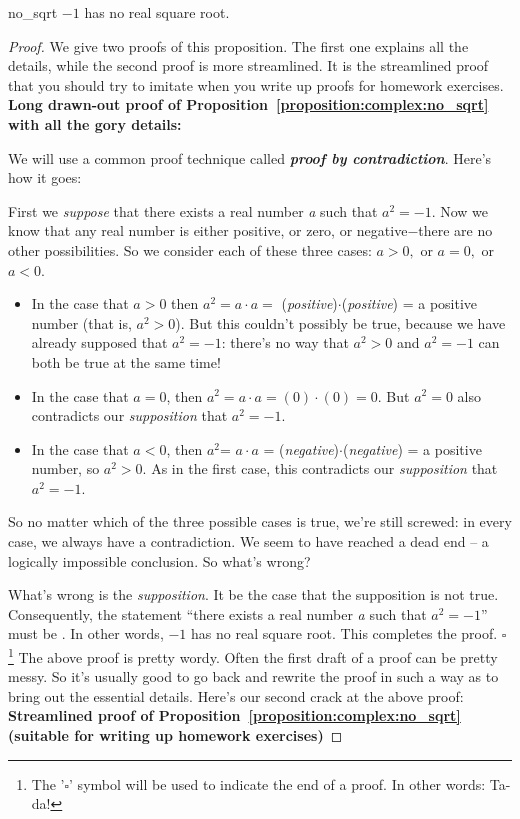 \begin{prop}{no_sqrt} $-1$ has no real square root.
\end{prop}
\begin{proof}
We give two proofs of this proposition. The first one explains all
the details, while the second proof is more streamlined. It is the streamlined
proof that you should try to imitate when you write up proofs for
homework exercises.
\medskip{}
\newline
\noindent \textbf{Long drawn-out proof of Proposition~\ref{proposition:complex:no_sqrt} with all the gory details:} 

We will use a common proof technique called {\bf \emph{ proof by contradiction}}. 
Here's how it goes:

First we \emph{suppose} that there exists a real number \emph{a} such that
$a^{2}=-1$. Now we know that any real number is either positive, or zero, or negative$-$there are no other possibilities. So we consider each of these three cases: $a>0,$ or $a=0,$ or $a<0$.

\begin{itemize}
\item
In the case that $a>0$ then $a^{2}= a\cdot a =$ (\emph{positive})$\cdot$(\emph{positive})
= a positive number (that is, $a^{2}>0$). But this couldn't possibly
be true, because we have already supposed that $a^{2}=-1$: there's
no way that $a^{2}>0$ and $a^{2}=-1$ can both be true at the same
time!

\item
In the case that $a=0$, then $a^{2}=a\cdot a = (0)\cdot(0)
= 0$. But $a^{2}=0$ also contradicts our \emph{supposition} that $a^{2}=-1$.
\item
In the case that $a<0$, then $a^{2}$= $a\cdot a$ = (\emph{negative})$\cdot$(\emph{negative})
= a positive number, so $a^{2}>0$. As in the first case, this contradicts
our \emph{supposition} that $a^{2}=-1$.
\end{itemize}

So no matter which of the three possible cases is true, we're still
screwed: in every case, we always have a contradiction. We seem to have reached a dead end -- a logically impossible conclusion. So what's wrong?

What's wrong is the \emph{supposition}. It  be the case that the supposition is not
true. Consequently, the statement ``there exists a real number
\emph{a} such that $a^{2}=-1$'' must be . In other
words, $-1$ has no real square root. This completes the proof. $\square$
\footnote{The '$\square$' symbol will be used to indicate the end of a proof. In other words: Ta-da!}
\medskip{}
\newline
The above proof is pretty wordy. Often the first draft of a proof can be pretty messy. So it's usually good to go back and rewrite the proof in such a  way as to bring out the essential details. Here's our second crack at the above proof:
\medskip{}
\newline
\noindent \textbf{Streamlined proof of Proposition~\ref{proposition:complex:no_sqrt} (suitable for writing up homework exercises)}


\end{proof}
